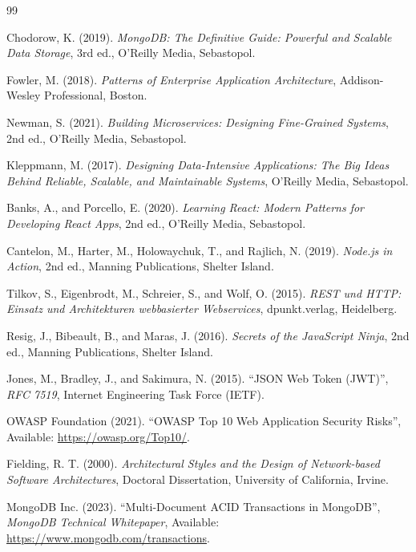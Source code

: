 \documentclass[12pt,a4paper]{report}
\begin{document}
\newpage
\begin{thebibliography}{99}

Chodorow, K. (2019). \textit{MongoDB: The Definitive Guide: Powerful and Scalable Data Storage}, 3rd ed., O'Reilly Media, Sebastopol.

Fowler, M. (2018). \textit{Patterns of Enterprise Application Architecture}, Addison-Wesley Professional, Boston.

Newman, S. (2021). \textit{Building Microservices: Designing Fine-Grained Systems}, 2nd ed., O'Reilly Media, Sebastopol.

Kleppmann, M. (2017). \textit{Designing Data-Intensive Applications: The Big Ideas Behind Reliable, Scalable, and Maintainable Systems}, O'Reilly Media, Sebastopol.

Banks, A., and Porcello, E. (2020). \textit{Learning React: Modern Patterns for Developing React Apps}, 2nd ed., O'Reilly Media, Sebastopol.

Cantelon, M., Harter, M., Holowaychuk, T., and Rajlich, N. (2019). \textit{Node.js in Action}, 2nd ed., Manning Publications, Shelter Island.

Tilkov, S., Eigenbrodt, M., Schreier, S., and Wolf, O. (2015). \textit{REST und HTTP: Einsatz und Architekturen webbasierter Webservices}, dpunkt.verlag, Heidelberg.

Resig, J., Bibeault, B., and Maras, J. (2016). \textit{Secrets of the JavaScript Ninja}, 2nd ed., Manning Publications, Shelter Island.

Jones, M., Bradley, J., and Sakimura, N. (2015). ``JSON Web Token (JWT)'', \textit{RFC 7519}, Internet Engineering Task Force (IETF).

OWASP Foundation (2021). ``OWASP Top 10 Web Application Security Risks'', Available: \url{https://owasp.org/Top10/}.

Fielding, R. T. (2000). \textit{Architectural Styles and the Design of Network-based Software Architectures}, Doctoral Dissertation, University of California, Irvine.

MongoDB Inc. (2023). ``Multi-Document ACID Transactions in MongoDB'', \textit{MongoDB Technical Whitepaper}, Available: \url{https://www.mongodb.com/transactions}.

\end{thebibliography}
\end{document}
